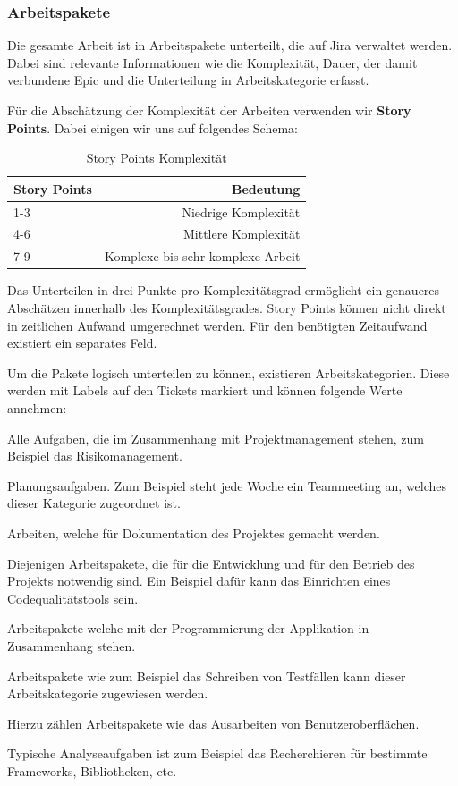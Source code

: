\subsubsection*{Arbeitspakete}
Die gesamte Arbeit ist in Arbeitspakete unterteilt, die auf Jira verwaltet werden. Dabei sind relevante Informationen wie die Komplexität, Dauer, der damit verbundene Epic und die Unterteilung in Arbeitskategorie erfasst.

Für die Abschätzung der Komplexität der Arbeiten verwenden wir \textbf{Story Points}. Dabei einigen wir uns auf folgendes Schema:

\renewcommand{\arraystretch}{1.5}
\begin{table}[h]
	\centering
	\begin{tabular}{| l | r |}
		\hline
		\textbf{Story Points} & \textbf{Bedeutung}\\
		\hline
		1-3 & Niedrige Komplexität \\
		4-6 & Mittlere Komplexität \\
		7-9 & Komplexe bis sehr komplexe Arbeit\\
		\hline
	\end{tabular}
	\caption[Story-Points]{Story Points Komplexität}
	\label{tab:story-points}
\end{table}

Das Unterteilen in drei Punkte pro Komplexitätsgrad ermöglicht ein genaueres Abschätzen innerhalb des Komplexitätsgrades. Story Points können nicht direkt in zeitlichen Aufwand umgerechnet werden. Für den benötigten Zeitaufwand existiert ein separates Feld.

Um die Pakete logisch unterteilen zu können, existieren Arbeitskategorien. Diese werden mit Labels auf den Tickets markiert und können folgende Werte annehmen:
\begin{description}[leftmargin=!,labelwidth=\widthof{\bfseries ProjektManagement}]
	\item[ProjektManagement] Alle Aufgaben, die im Zusammenhang mit Projektmanagement stehen, zum Beispiel das Risikomanagement.
	\item[Planung] Planungsaufgaben. Zum Beispiel steht jede Woche ein Teammeeting an, welches dieser Kategorie zugeordnet ist.
	\item[Dokumentation] Arbeiten, welche für Dokumentation des Projektes gemacht werden.
	\item[Infrastruktur] Diejenigen Arbeitspakete, die für die Entwicklung und für den Betrieb des Projekts notwendig sind. Ein Beispiel dafür kann das Einrichten eines Codequalitätstools sein. 
	\item[Entwicklung] Arbeitspakete welche mit der Programmierung der Applikation in Zusammenhang stehen.
	\item[Testing] Arbeitspakete wie zum Beispiel das Schreiben von Testfällen kann dieser Arbeitskategorie zugewiesen werden.
	\item[Design] Hierzu zählen Arbeitspakete wie das Ausarbeiten von Benutzeroberflächen.
	\item[Analyse] Typische Analyseaufgaben ist zum Beispiel das Recherchieren für bestimmte Frameworks, Bibliotheken, etc. 
\end{description}

